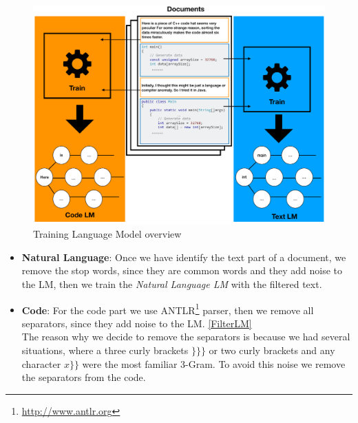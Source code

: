 \documentclass[12pt,mscthesis]{usiinfthesis}
\begin{document}
	\begin{figure}[htbp]
	\centering
	\includegraphics[width=\textwidth]{trainingLm}
	\caption{Training Language Model overview}
	\label{trainingLm}
	\end{figure}
	\newpage
	\begin{itemize}
		\item \textbf{Natural Language}: Once we have identify the text part of a document, we remove the stop words, since they are common words and they add noise to the LM, then we train the \emph{Natural Language LM} with the filtered text.
		\item \textbf{Code}: For the code part we use ANTLR\footnote{\url{http://www.antlr.org}} parser, then we remove all separators, since they add noise to the LM. \cref{FilterLM}\\
		The reason why we decide to remove the separators is because we had several situations, where a three curly brackets $\}\}\}$ or two curly brackets and any character $x\}\}$ were the most familiar 3-Gram. To avoid this noise we remove the separators from the code.
	\end{itemize}
	
	
\end{document}
